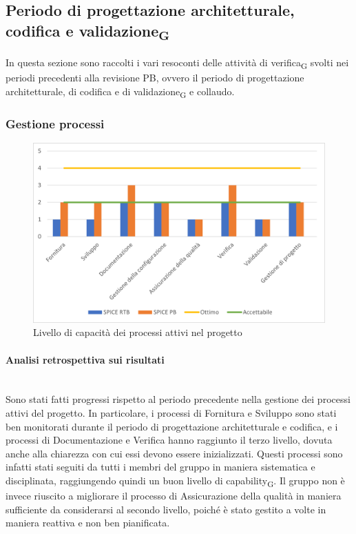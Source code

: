 \subsection{Periodo di progettazione architetturale, codifica e validazione\textsubscript{G}}
In questa sezione sono raccolti i vari resoconti delle attività di verifica\textsubscript{G} svolti nei periodi precedenti alla revisione PB, ovvero il periodo di progettazione architetturale, di codifica e di validazione\textsubscript{G} e collaudo.
\subsubsection{Gestione processi}
\begin{figure}[H]
	\centering
	\includegraphics[scale=0.9]{img/SPICE2.png}
	\caption{Livello di capacità dei processi attivi nel progetto}
\end{figure}
\paragraph{Analisi retrospettiva sui risultati}\mbox{}\\
Sono stati fatti progressi rispetto al periodo precedente nella gestione dei processi attivi del progetto. In particolare, i processi di Fornitura e Sviluppo sono stati ben monitorati durante il periodo di progettazione architetturale e codifica, e i processi di Documentazione e Verifica hanno raggiunto il terzo livello, dovuta anche alla chiarezza con cui essi devono essere inizializzati. Questi processi sono infatti stati seguiti da tutti i membri del gruppo in maniera sistematica e disciplinata, raggiungendo quindi un buon livello di capability\textsubscript{G}.
Il gruppo non è invece riuscito a migliorare il processo di Assicurazione della qualità in maniera sufficiente da considerarsi al secondo livello, poiché è stato gestito a volte in maniera reattiva e non ben pianificata.

